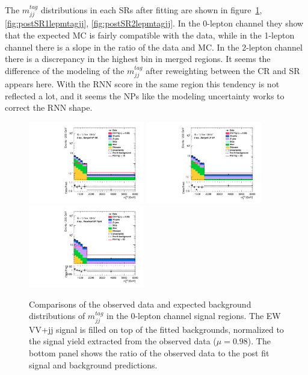 The $m^{tag}_{jj}$ distributions in each SRs after fitting are shown in figure~\ref{fig:postSR0lepmtagjj}, \ref{fig:postSR1lepmtagjj}, \ref{fig:postSR2lepmtagjj}.
In the 0-lepton channel they show that the expected MC is fairly compatible with the data, while in the 1-lepton channel there is a slope in the ratio of the data and MC. In the 2-lepton channel there is a discrepancy in the highest bin in merged regions.
It seems the difference of the modeling of the $m^{tag}_{jj}$ after reweighting between the CR and SR appears here. 
With the RNN score in the same region this tendency is not reflected a lot, and it seems the NPs like the modeling uncertainty works to correct the RNN shape.
\begin{figure}[]
    \centering
    \includegraphics[width=0.45\textwidth]{figures/PostFit/Region_distMTagJets_DSRVBSHP_BMin0_J0_incJet1_L0_T0_incFat1_Y6051_incTag1_Fat1_GlobalFit_unconditionnal_mu1log.pdf}
    \includegraphics[width=0.45\textwidth]{figures/PostFit/Region_distMTagJets_DSRVBSLP_BMin0_J0_incJet1_L0_T0_incFat1_Y6051_incTag1_Fat1_GlobalFit_unconditionnal_mu1log.pdf}
    \includegraphics[width=0.45\textwidth]{figures/PostFit/Region_distMTagJets_DSRVBSFid_BMin0_T0_Y6051_incTag1_J2_L0_incJet1_GlobalFit_unconditionnal_mu1log.pdf}
      \caption{Comparisons of the observed data and expected background distributions of $m^{tag}_{jj}$ in the 0-lepton channel signal regions. The EW VV+jj signal is filled on top of the fitted backgrounds, normalized to the signal yield extracted from the observed data ($\mu = 0.98$). The bottom panel shows the ratio of the observed data to the post fit signal and background predictions.}
      \label{fig:postSR0lepmtagjj}
\end{figure}
